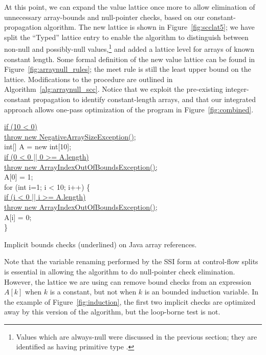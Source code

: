 \documentclass[12pt,titlepage,twoside]{article}
\begin{document}
At this point, we can expand the value lattice once more to allow
elimination of unnecessary array-bounds and null-pointer checks, based
on our constant-propagation algorithm.  The new lattice is shown in
Figure~\ref{fig:scclat5}; we have split the ``Typed'' lattice entry to
enable the algorithm to distinguish between non-null and possibly-null
values,\footnote{Values which are always-null were discussed in the
previous section; they are identified as having primitive type .}
and added a lattice level for arrays of known constant length.  
Some formal definition of the new value lattice can be found in
Figure~\ref{fig:arraynull_rules}; the meet rule is still the least upper
bound on the lattice.  Modifications to the  procedure are
outlined in Algorithm~\ref{alg:arraynull_scc}.
Notice that we exploit the pre-existing integer-constant propagation to
identify constant-length arrays, and that our integrated approach
allows one-pass optimization of the program in Figure~\ref{fig:combined}.

\begin{myfigure}\newcommand{\implicitcheck}[1]{\underline{#1}}
\begin{samplecode}
\implicitcheck{if (10 < 0)}\\
\>\implicitcheck{throw new NegativeArraySizeException();}\\
int[] A = new int[10]; \\
\implicitcheck{if (0 < 0 || 0 >= A.length)}\\
\>\implicitcheck{throw new ArrayIndexOutOfBoundsException();}\\
A[0] = 1;\\
for (int i=1; i < 10; i++) \{\\
\>\implicitcheck{if (i < 0 || i >= A.length)}\\
\>\>\implicitcheck{throw new ArrayIndexOutOfBoundsException();}\\
\>A[i] = 0;\\
\}\\
\end{samplecode}
\caption[Implicit bounds checks on Java array references.]
{Implicit bounds checks (underlined) on Java array references.}
\label{fig:induction}
\end{myfigure}
Note that the variable renaming performed by the SSI form at
control-flow splits is essential in allowing the algorithm to do 
null-pointer check elimination.  However, the lattice we are using
can remove bound checks from an expression $A[k]$ when $k$ is a
constant, but not when $k$ is an bounded induction variable.
In the example of Figure~\vref{fig:induction}, the first two implicit
checks are optimized away by this version of the algorithm, but the
loop-borne test is not. 
\end{document}
